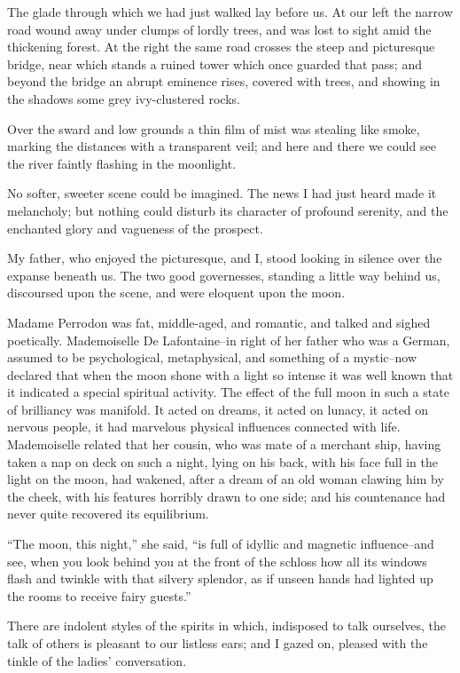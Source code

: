 \documentclass[11pt,twoside,makeidx,hidelinks,]{memoir}
\begin{document}
The glade through which we had just walked lay before us. At our left
the narrow road wound away under clumps of lordly trees, and was lost to
sight amid the thickening forest. At the right the same road crosses the
steep and picturesque bridge, near which stands a ruined tower which
once guarded that pass; and beyond the bridge an abrupt eminence rises,
covered with trees, and showing in the shadows some grey
ivy-clustered rocks.

Over the sward and low grounds a thin film of mist was stealing like
smoke, marking the distances with a transparent veil; and here and there
we could see the river faintly flashing in the moonlight.

No softer, sweeter scene could be imagined. The news I had just heard
made it melancholy; but nothing could disturb its character of profound
serenity, and the enchanted glory and vagueness of the prospect.

My father, who enjoyed the picturesque, and I, stood looking in silence
over the expanse beneath us. The two good governesses, standing a little
way behind us, discoursed upon the scene, and were eloquent upon
the moon.

Madame Perrodon was fat, middle-aged, and romantic, and talked and
sighed poetically. Mademoiselle De Lafontaine--in right of her father
who was a German, assumed to be psychological, metaphysical, and
something of a mystic--now declared that when the moon shone with a
light so intense it was well known that it indicated a special spiritual
activity. The effect of the full moon in such a state of brilliancy was
manifold. It acted on dreams, it acted on lunacy, it acted on nervous
people, it had marvelous physical influences connected with life.
Mademoiselle related that her cousin, who was mate of a merchant ship,
having taken a nap on deck on such a night, lying on his back, with his
face full in the light on the moon, had wakened, after a dream of an old
woman clawing him by the cheek, with his features horribly drawn to one
side; and his countenance had never quite recovered its equilibrium.

``The moon, this night,'' she said, ``is full of idyllic and magnetic
influence--and see, when you look behind you at the front of the schloss
how all its windows flash and twinkle with that silvery splendor, as if
unseen hands had lighted up the rooms to receive fairy guests.''

There are indolent styles of the spirits in which, indisposed to talk
ourselves, the talk of others is pleasant to our listless ears; and I
gazed on, pleased with the tinkle of the ladies' conversation.
\end{document}
